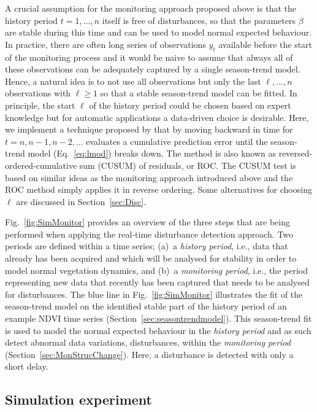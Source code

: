 \documentclass[authoryear,preprint,review,10pt]{elsarticle}
\begin{document}
A crucial assumption for the monitoring approach proposed above is that
the history period $t = 1, \dots, n$ itself is free of disturbances, so that the parameters $\beta$ are stable during this time and can be used to model normal expected behaviour. In practice, there are often long series of observations $y_t$ available
before the start of the monitoring process and it would be naive to assume
that always all of these observations can be adequately captured by a single
season-trend model. Hence, a natural idea is to not use all observations
but only the last $\ell, \dots, n$ observations with $\ell \ge 1$ so that a stable
season-trend model can be fitted. In principle, the start $\ell$ of the history period
could be chosen based on expert knowledge but for automatic applications a data-driven
choice is desirable.
Here, we implement a technique proposed by \citet{Pesaran2002} that by moving backward in time for $t = n, n-1, n-2, \dots$ evaluates a cumulative prediction error until the season-trend model (Eq.~\ref{eq:lmod}) breaks down. The method is also known as reversed-ordered-cumulative sum (CUSUM) of residuals, or ROC.
The CUSUM test \citep[see][for more details]{Zeileis2002} is based on similar ideas as the monitoring approach introduced
above and the ROC method simply applies it in reverse ordering. Some alternatives for
choosing $\ell$ are discussed in Section~\ref{sec:Disc}.

Fig.~\ref{fig:SimMonitor} provides an overview of the three steps that are being performed when applying the real-time disturbance detection approach. Two periods are defined within a time series; (a)~a \emph{history period}, i.e., data that already has been acquired and which will be analysed for stability in order to model normal vegetation dynamics, and (b)~a \emph{monitoring period}, i.e., the period representing new data that recently has been captured that needs to be analysed for disturbances. The blue line in Fig.~\ref{fig:SimMonitor} illustrates the fit of the season-trend model on the identified stable part of the history period of an example NDVI time series (Section~\ref{sec:seasontrendmodel}). This season-trend fit is used to model the normal expected behaviour in the \emph{history period} and as such detect abnormal data variations, disturbances, within the \emph{monitoring period}
(Section~\ref{sec:MonStrucChange}). Here, a disturbance is detected with only a short delay.

\subsection{Simulation experiment}\label{sec:Valsim}
\end{document}
